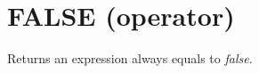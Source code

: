 \section{FALSE (operator)}\label{false:falseoperator}\hypertarget{false:falseoperator}{}
Returns an expression always equals to \emph{false}.

